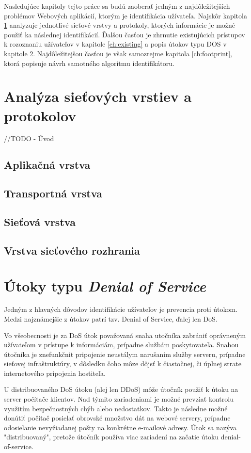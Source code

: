 \documentclass[
  printed, %
  table,   %
  lof,     %
  lot,     %
]{fithesis3}
\begin{document}
Nasledujúce kapitoly tejto práce sa budú zaoberať jedným z najdôležitejších
problémov Webových aplikácií, ktorým je identifikácia užívateľa. Najskôr kapitola
\ref{ch:net-layers} analyzuje jednotlivé sieťové vrstvy a protokoly, ktorých
informácie je možné použiť ka následnej identifikácií. Ďalšou časťou je zhrnutie
existujúcich prístupov k rozoznaniu užívateľov v kapitole \ref{ch:existing} a 
popis útokov typu DOS v kapitole \ref{ch:dos}. Najdôležitejšou časťou je však
samozrejme kapitola \ref{ch:footprint}, ktorá popisuje návrh samotného 
algoritmu identifikátoru.

\chapter{Analýza sieťových vrstiev a protokolov}
\label{ch:net-layers}
//TODO - Úvod
\section{Aplikačná vrstva}
\section{Transportná vrstva}
\section{Sieťová vrstva}
\section{Vrstva sieťového rozhrania}

\chapter{Útoky typu \textit{Denial of Service}}
\label{ch:dos}
Jedným z hlavných dôvodov identifikácie užívateľov je prevencia proti útokom. Medzi
najznámejšie z útokov patrí tzv. Denial of Service, ďalej len DoS.

Vo všeobecnosti je za DoS útok považovaná snaha utočníka zabrániť oprávneným
užívateľom v prístupe k informáciám, prípadne službám poskytovateľa. Snahou útočníka
je znefunkčnit pripojenie neustálym narušaním služby serveru, prípadne sieťovej
infraštruktúry, v dôsledku čoho môze dôjsť k čiastočnej, či úplnej strate
internetového pripojenia hostiteľa. 

U distribuovaného DoS útoku (alej len DDoS) môže útočník použiť k útoku na server
počítače klientov. Nad týmito zariadeniami je možné prevziať kontrolu využitím
bezpečnostných chýb alebo nedostatkov. Takto je následne možné donútiť počítač
posielať obrovské množstvo dát na webové servery, prípadne odosielanie nevyžiadanej
pošty na konkrétne e-mailové adresy. Útok sa nazýva "distribuovaný", pretože útočník
používa viac zariadení na začatie útoku denial-of-service.
\end{document}

